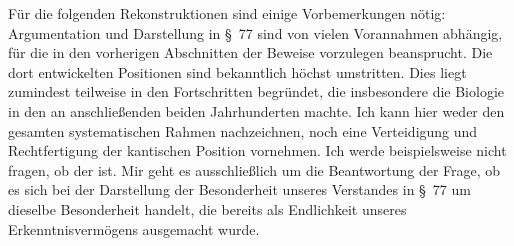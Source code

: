 Für die folgenden Rekonstruktionen sind einige Vorbemerkungen nötig:
Argumentation und Darstellung in \S~77 sind von vielen Vorannahmen abhängig, für
die  in den vorherigen Abschnitten der  Beweise vorzulegen beansprucht. Die dort
entwickelten Positionen sind bekanntlich höchst umstritten. Dies liegt zumindest teilweise in den
Fortschritten begründet, die insbesondere die Biologie in den an
 anschließenden beiden Jahrhunderten machte. Ich kann hier
weder den gesamten systematischen Rahmen nachzeichnen, noch eine Verteidigung
und Rechtfertigung der kantischen Position vornehmen. Ich werde beispielsweise
nicht fragen, ob  der  ist. Mir geht es ausschließlich um die Beantwortung der Frage, ob
es sich bei der Darstellung der Besonderheit unseres Verstandes in \S~77 um
dieselbe Besonderheit handelt, die bereits als Endlichkeit unseres
Erkenntnisvermögens ausgemacht wurde.

